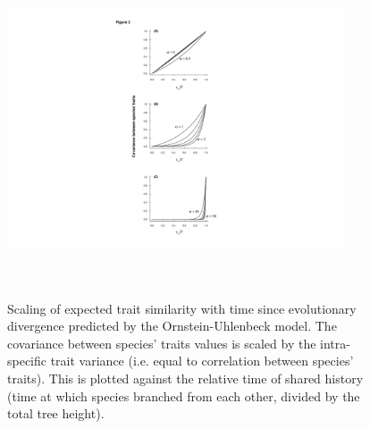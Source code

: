 \documentclass[a4paper,12pt]{article}
\begin{document}

\begin{figure}
\centering
    \includegraphics[width=10cm, height=10cm, keepaspectratio=true]{Figures/OU_figure2.pdf}
\caption{Scaling of expected trait similarity with time since evolutionary divergence predicted by the Ornstein-Uhlenbeck model. The covariance between species’ traits values is scaled by the intra-specific trait variance (i.e. equal to correlation between species’ traits). This is plotted against the relative time of shared history (time at which species branched from each other, divided by the total tree height). }
\label{figure.traitsim}
\end{figure}
\end{document}
